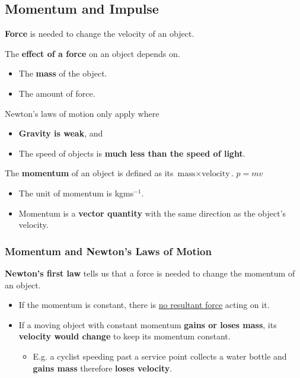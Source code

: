\subsection{Momentum and Impulse}

\textbf{Force} is needed to change the velocity of an object.

The \textbf{effect of a force} on an object depends on.
\begin{itemize}
    \item The \textbf{mass} of the object.
    \item The amount of force.
\end{itemize}

Newton's laws of motion only apply where
\begin{itemize}
    \item \textbf{Gravity is weak}, and
    \item The speed of objects is \textbf{much less than the speed of light}.
\end{itemize}

The \textbf{momentum} of an object is defined as its $\text{mass}\times\text{velocity}$.
$p=mv$
\begin{itemize}
    \item The unit of momentum is kgms$^{-1}$.
    \item Momentum is a \textbf{vector quantity} with the same direction as the object's velocity.
\end{itemize}

\subsubsection*{Momentum and Newton's Laws of Motion}

\textbf{Newton's first law} tells us that a force is needed to change the momentum of an object.
\begin{itemize}
    \item If the momentum is constant, there is \underline{no resultant force} acting on it.
    \item If a moving object with constant momentum \textbf{gains or loses mass}, its \textbf{velocity would change} to keep its momentum constant.
        \begin{itemize}
            \item E.g. a cyclist speeding past a service point collects a water bottle and \textbf{gains mass} therefore \textbf{loses velocity}.
        \end{itemize}
\end{itemize}


